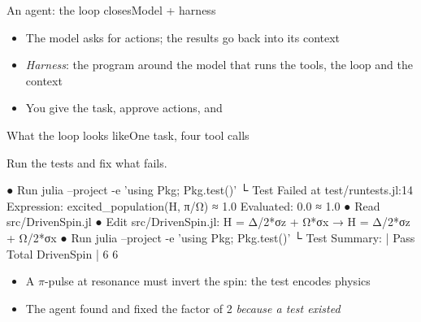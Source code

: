 \begin{frame}{An agent: the loop closes}{Model + harness}
  \vspace{1ex}
  \begin{center}
  \end{center}
  \vspace{1ex}

  \begin{itemize}
    \item<2-> The model asks for actions; the results go back into its context
    \item<3-> \emph{Harness}: the program around the model that runs the tools,
          the loop and the context
    \item<4-> You give the task, approve actions, and 
  \end{itemize}

  \slidecite{\citeTheoPhysEval\\ \citeAgents}
\end{frame}

\begin{frame}[fragile]{What the loop looks like}{One task, four tool calls}
\begin{prompt}
Run the tests and fix what fails.
\end{prompt}
\begin{agentlog}
● Run   julia --project -e 'using Pkg; Pkg.test()'
  └ Test Failed at test/runtests.jl:14
      Expression: excited_population(H, π/Ω) ≈ 1.0
       Evaluated: 0.0 ≈ 1.0
● Read  src/DrivenSpin.jl
● Edit  src/DrivenSpin.jl:   H = Δ/2*σz + Ω*σx   →   H = Δ/2*σz + Ω/2*σx
● Run   julia --project -e 'using Pkg; Pkg.test()'
  └ Test Summary: | Pass  Total
    DrivenSpin    |    6      6
\end{agentlog}
  \begin{itemize}
    \item<2-> A $\pi$-pulse at resonance must invert the spin: the test encodes physics
    \item<3-> The agent found and fixed the factor of 2 \emph{because a test existed}
  \end{itemize}
\end{frame}

